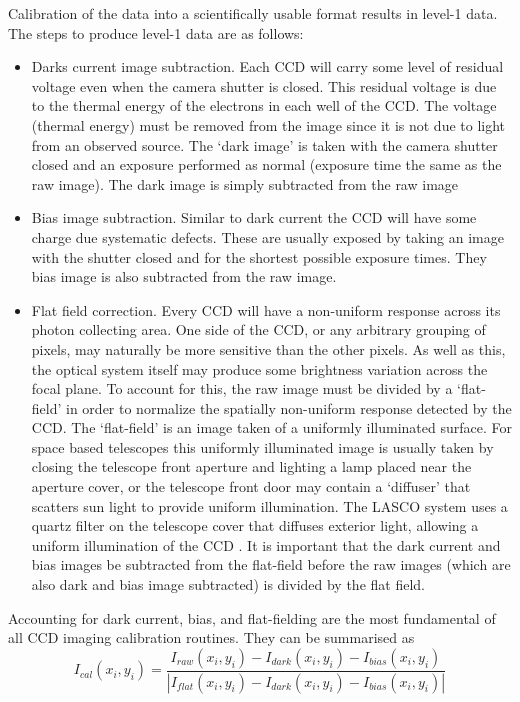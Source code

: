 Calibration of the data into a scientifically usable format results in level-1 data. The steps to produce level-1 data are as follows:
\begin{itemize}
\item Darks current image subtraction. Each CCD will carry some level of residual voltage even when the camera shutter is closed. This residual voltage is due to the thermal energy of the electrons in each well of the CCD. The voltage (thermal energy) must be removed from the image since it is not due to light from an observed source. The `dark image' is taken with the camera shutter closed and an exposure performed as normal (exposure time the same as the raw image). The dark image is simply subtracted from the raw image
%
\item Bias image subtraction. Similar to dark current the CCD will have some charge due systematic defects. These are usually exposed by taking an image with the shutter closed and for the shortest possible exposure times. They bias image is also subtracted from the raw image.
%
\item Flat field correction. Every CCD will have a non-uniform response across its photon collecting area. One side of the CCD, or any arbitrary grouping of pixels, may naturally be more sensitive than the other pixels. As well as this, the optical system itself may produce some brightness variation across the focal plane. To account for this, the raw image must be divided by a `flat-field' in order to normalize the spatially non-uniform response detected by the CCD. The `flat-field' is an image taken of a uniformly illuminated surface. For space based telescopes this uniformly illuminated image is usually taken by closing the telescope front aperture and lighting a lamp placed near the aperture cover, or the telescope front door may contain a `diffuser' that scatters sun light to provide uniform illumination. The LASCO system uses a quartz filter on the telescope cover that diffuses exterior light, allowing a uniform illumination of the CCD \citep{bru95}. It is important that the dark current and bias images be subtracted from the flat-field before the raw images (which are also dark and bias image subtracted) is divided by the flat field.
%
\end{itemize}
Accounting for dark current, bias, and flat-fielding are the most fundamental of all CCD imaging calibration routines. They can be summarised as
\begin{equation}
I_{cal}(x_i, y_i) = \frac{ I_{raw}(x_i, y_i)  - I_{dark}(x_i, y_i) - I_{bias}(x_i, y_i)  }{ | I_{flat}(x_i, y_i) - I_{dark}(x_i, y_i) - I_{bias}(x_i, y_i)| }
\end{equation}

